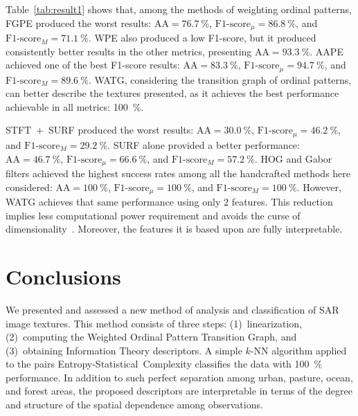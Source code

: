 Table~\ref{tab:result1} shows that, among the methods of weighting ordinal patterns, FGPE produced the worst results: $\text{AA} = \SI{76.7}{\percent}$, $\text{F1-score}_\mu = \SI{86.8}{\percent}$, and $\text{F1-score}_M = \SI{71.1}{\percent}$.
%
WPE also produced a low F1-score, but it produced consistently better results in the other metrics, presenting $\text{AA} = \SI{93.3}{\percent}$.
%
AAPE achieved one of the best F1-score results: $\text{AA} = \SI{83.3}{\percent}$, $\text{F1-score}_\mu = \SI{94.7}{\percent}$, and $\text{F1-score}_M = \SI{89.6}{\percent}$.
%
WATG, considering the transition graph of ordinal patterns, can better describe the textures presented, as it achieves the best performance achievable in all metrics: \SI{100}{\percent}.

\mbox{STFT + SURF} produced the worst results: $\text{AA} = \SI{30.0}{\percent}$, $\text{F1-score}_\mu = \SI{46.2}{\percent}$, and $\text{F1-score}_M = \SI{29.2}{\percent}$.
%
SURF alone provided a better performance: $\text{AA} = \SI{46.7}{\percent}$,  $\text{F1-score}_\mu = \SI{66.6}{\percent}$, and $\text{F1-score}_M = \SI{57.2}{\percent}$.
%
HOG and Gabor filters achieved the highest success rates
among all the handcrafted methods here considered: $\text{AA} = \SI{100}{\percent}$, $\text{F1-score}_\mu = \SI{100}{\percent}$, and $\text{F1-score}_M = \SI{100}{\percent}$.
However, WATG achieves that same performance using only $2$ features.
This reduction implies less computational power requirement and avoids the curse of dimensionality~\cite{TheCursesofDimensionality2018}.
Moreover, the features it is based upon are fully interpretable.

\section{Conclusions}\label{Conclusion}

We presented and assessed a new method of analysis and classification of SAR image textures.
This method consists of three steps: 
(1)~linearization, 
(2)~computing the Weighted Ordinal Pattern Transition Graph, and 
(3)~obtaining Information Theory descriptors.
A simple $k$-NN algorithm applied to the pairs Entropy-Statistical~Complexity classifies the data with \SI{100}{\percent} performance.
In addition to such perfect separation among urban, pasture, ocean, and forest areas, the proposed descriptors are interpretable in terms of the degree and structure of the spatial dependence among observations.

